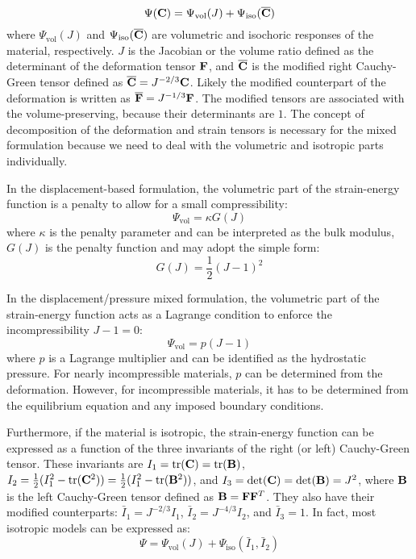 \begin{equation} \label{energy_split}
\Psi(\bold{C}) = \Psi_\mathrm{vol}(J) + \Psi_\mathrm{iso}(\overline{\bold{C}})
\end{equation}
where $\Psi_\mathrm{vol}(J)$ and $\Psi_\mathrm{iso}(\overline{\bold{C}})$ are volumetric and isochoric responses of the material, respectively. $J$ is the Jacobian or the volume ratio defined as the determinant of the deformation tensor $\bold{F}$, and $\overline{\bold{C}}$ is the modified right Cauchy-Green tensor defined as 
$\overline{\bold{C}}  = J^{-2/3} \bold{C}$. Likely the modified counterpart of the deformation is written as $\overline{\bold{F}} = J^{-1/3} \bold{F}$. The modified tensors are associated with the volume-preserving, because their determinants are $1$. The concept of decomposition of the deformation and strain tensors is necessary for the mixed formulation because we need to deal with the volumetric and isotropic parts individually.

In the displacement-based formulation, the volumetric part of the strain-energy function is a penalty to allow for a small compressibility:
\begin{equation} \label{penalty}
\Psi_\mathrm{vol} = \kappa G(J)
\end{equation}
where $\kappa$ is the penalty parameter and can be interpreted as the bulk modulus, $G(J)$ is the penalty function and may adopt the simple form:
\begin{equation} \label{penalty2}
G(J) = \frac{1}{2}(J - 1)^2
\end{equation}

In the displacement/pressure mixed formulation, the volumetric part of the strain-energy function acts as a Lagrange condition to enforce the incompressibility $J -1 = 0$:
\begin{equation} \label{Lagrange}
\Psi_\mathrm{vol} = p(J-1)
\end{equation}
where $p$ is a Lagrange multiplier and can be identified as the hydrostatic pressure. For nearly incompressible materials, $p$ can be determined from the deformation. However, for incompressible materials, it has to be determined from the equilibrium equation and any imposed boundary conditions. 

Furthermore, if the material is isotropic, the strain-energy function can be expressed as a function of the three invariants of the right (or left) Cauchy-Green tensor. 
These invariants are 
$I_1 = \mathrm{tr}(\bold{C}) = \mathrm{tr}(\bold{B})$, $I_2 = \frac{1}{2}(I_1^2 - \mathrm{tr}(\bold{C}^2)) = \frac{1}{2}(I_1^2 - \mathrm{tr}(\bold{B}^2))$, and $I_3 = \mathrm{det}(\bold{C}) = \mathrm{det}(\bold{B}) = J^2$, where $\bold{B}$ is the left Cauchy-Green tensor defined as $\bold{B} = \bold{F}{\bold{F}}^T$. 
They also have their modified counterparts: $\bar{I}_1 = J^{-2/3}I_1$, $\bar{I}_2 = J^{-4/3}I_2$, and $\bar{I}_3 = 1$. In fact, most isotropic models can be expressed as:
\begin{equation}
\Psi = \Psi_\mathrm{vol}(J) + \Psi_\mathrm{iso}(\bar{I}_1, \bar{I}_2)
\end{equation}

